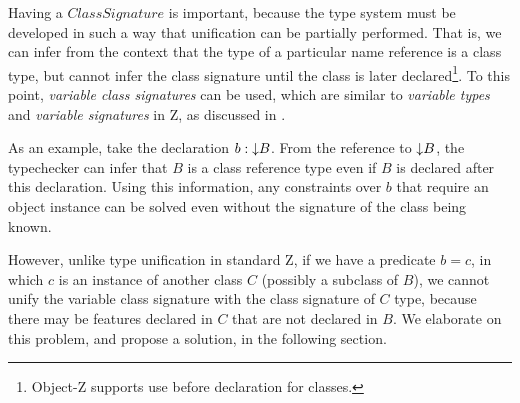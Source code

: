 Having a $ClassSignature$ is important, because the type system must
be developed in such a way that unification can be partially
performed. That is, we can infer from the context that the type of a
particular name reference is a class type, but cannot infer the class
signature until the class is later declared\footnote{Object-Z supports
use before declaration for classes.}.  To this point, {\em variable
class signatures} can be used, which are similar to {\em variable
types} and {\em variable signatures} in Z, as discussed in
\cite{toyn00}.

As an example, take the declaration $b : \mathord\downarrow B$. From the reference
to $\mathord\downarrow B$, the typechecker can infer that $B$ is a class reference
type even if $B$ is declared after this declaration. Using this
information, any constraints over $b$ that require an object instance
can be solved even without the signature of the class being known.

However, unlike type unification in standard Z, if we have
a predicate $b = c$, in which $c$ is an instance of another class $C$
(possibly a subclass of $B$), we cannot unify the
variable class signature with the class signature of $C$ type, because
there may be features declared in $C$ that are not declared in
$B$. We elaborate on this problem, and propose a solution, 
in the following section.
